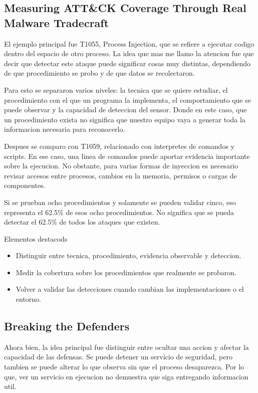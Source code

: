 \documentclass[letterpaper,12pt]{article}
\begin{document}
\newpage
\subsection{Measuring ATT\&CK Coverage Through Real Malware Tradecraft}

El ejemplo principal fue T1055, Process Injection,
que se refiere a ejecutar codigo dentro del espacio de otro
proceso. La idea que mas me llamo la atencion fue que decir que
detectar este ataque puede significar cosas muy distintas,
dependiendo de que procedimiento se probo y de que datos se
recolectaron.

Para esto se separaron varios niveles: la tecnica que se quiere
estudiar, el procedimiento con el que un programa la implementa,
el comportamiento que se puede observar y la capacidad de
deteccion del sensor. Donde en este caso, que un procedimiento
exista no significa que nuestro equipo vaya a generar toda la
informacion necesaria para reconocerlo.

Despues se comparo con T1059, relacionado con interpretes de
comandos y scripts. En ese caso, una linea de comandos puede
aportar evidencia importante sobre la ejecucion. No obstante,
para varias formas de inyeccion es necesario revisar accesos
entre procesos, cambios en la memoria, permisos o cargas de
componentes. 

Si se prueban
ocho procedimientos y solamente se pueden validar cinco, eso
representa el 62.5\% de esos ocho procedimientos. No significa
que se pueda detectar el 62.5\% de todos los ataques que existen.


Elementos destacods 

\begin{itemize}
    \item Distinguir entre tecnica, procedimiento, evidencia observable y deteccion.
    \item Medir la cobertura sobre los procedimientos que realmente se probaron.
    \item Volver a validar las detecciones cuando cambian las implementaciones o el entorno.
\end{itemize}

\subsection{Breaking the Defenders}

Ahora bien, la idea principal fue distinguir entre ocultar una
accion y afectar la capacidad de las defensas. Se puede detener
un servicio de seguridad, pero tambien se puede alterar lo que
observa sin que el proceso desaparezca. Por lo que, ver un
servicio en ejecucion no demuestra que siga entregando
informacion util.
\end{document}
